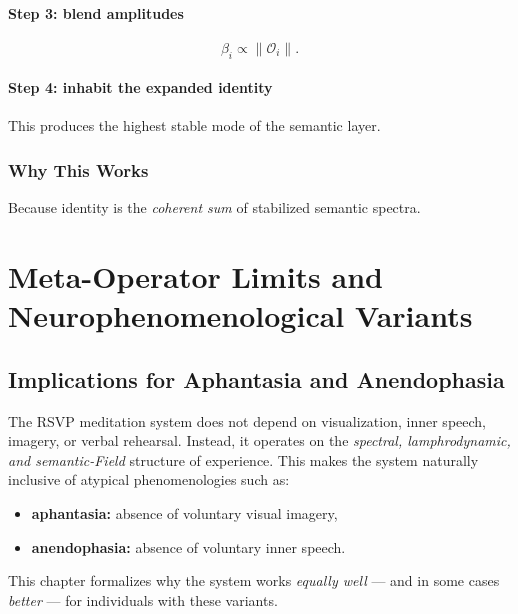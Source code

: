 \documentclass[12pt]{article}
\begin{document}
\subsection*{Step 3: blend amplitudes}

\[
\beta_i \propto \|\mathcal{O}_i\|.
\]

\subsection*{Step 4: inhabit the expanded identity}

This produces the highest stable mode of the semantic layer.

\section{Why This Works}

Because identity is the \emph{coherent sum} of stabilized semantic spectra.


\part{Meta-Operator Limits and Neurophenomenological Variants}

\chapter{Implications for Aphantasia and Anendophasia}

The RSVP meditation system does not depend on visualization,
inner speech, imagery, or verbal rehearsal.  
Instead, it operates on the \emph{spectral, lamphrodynamic, and semantic-Field} 
structure of experience.  
This makes the system naturally inclusive of atypical phenomenologies such as:

\begin{itemize}
    \item \textbf{aphantasia:} absence of voluntary visual imagery,
    \item \textbf{anendophasia:} absence of voluntary inner speech.
\end{itemize}

This chapter formalizes why the system works \emph{equally well} — and in some cases
\emph{better} — for individuals with these variants.
\end{document}
